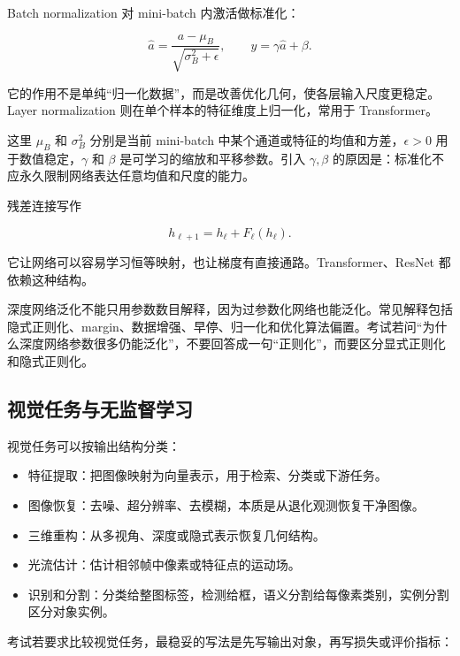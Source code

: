 Batch normalization 对 mini-batch 内激活做标准化：

\[
  \widehat a
  =
  \frac{a-\mu_B}{\sqrt{\sigma_B^2+\epsilon}},
  \qquad
  y=\gamma \widehat a+\beta.
\]

它的作用不是单纯“归一化数据”，而是改善优化几何，使各层输入尺度更稳定。Layer normalization 则在单个样本的特征维度上归一化，常用于 Transformer。

这里 \(\mu_B\) 和 \(\sigma_B^2\) 分别是当前 mini-batch 中某个通道或特征的均值和方差，\(\epsilon>0\) 用于数值稳定，\(\gamma\) 和 \(\beta\) 是可学习的缩放和平移参数。引入 \(\gamma,\beta\) 的原因是：标准化不应永久限制网络表达任意均值和尺度的能力。

残差连接写作

\[
  h_{\ell+1}=h_\ell+F_\ell(h_\ell).
\]

它让网络可以容易学习恒等映射，也让梯度有直接通路。Transformer、ResNet 都依赖这种结构。

深度网络泛化不能只用参数数目解释，因为过参数化网络也能泛化。常见解释包括隐式正则化、margin、数据增强、早停、归一化和优化算法偏置。考试若问“为什么深度网络参数很多仍能泛化”，不要回答成一句“正则化”，而要区分显式正则化和隐式正则化。

\subsection{视觉任务与无监督学习}

视觉任务可以按输出结构分类：

\begin{itemize}
  \item 特征提取：把图像映射为向量表示，用于检索、分类或下游任务。
  \item 图像恢复：去噪、超分辨率、去模糊，本质是从退化观测恢复干净图像。
  \item 三维重构：从多视角、深度或隐式表示恢复几何结构。
  \item 光流估计：估计相邻帧中像素或特征点的运动场。
  \item 识别和分割：分类给整图标签，检测给框，语义分割给每像素类别，实例分割区分对象实例。
\end{itemize}

考试若要求比较视觉任务，最稳妥的写法是先写输出对象，再写损失或评价指标：

